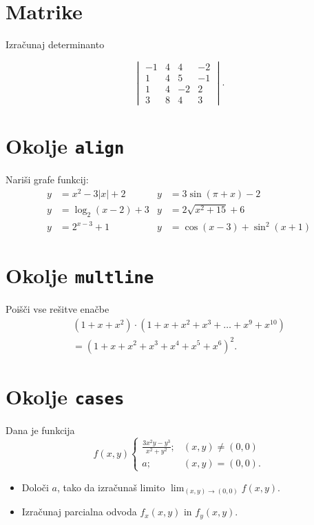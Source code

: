 \documentclass[a4paper,12pt]{article}
\begin{document}
\section*{Matrike}
Izračunaj determinanto

\[
 \begin{vmatrix}   
   -1 & 4 & 4 & -2 \\
   1 & 4 & 5 & -1 \\
   1 & 4 & -2 & 2 \\
   3 & 8 & 4 & 3 
 \end{vmatrix}.
\]

\section*{Okolje \texttt{align}}
Nariši grafe funkcij:
\begin{align*}
y &= x^2 - 3|x| + 2 &  y &= 3 \sin(\pi+x) - 2\\
y &= \log_2(x-2) + 3 & y &= 2 \sqrt{x^2+15} + 6\\
y &= 2^{x-3} + 1  &    y &= \cos(x-3) + \sin^2(x+1)
\end{align*}


\section*{Okolje \texttt{multline}}
Poišči vse rešitve enačbe
\begin{multline*}
(1+x+x^2) \cdot (1+x+x^2+x^3+\ldots+x^9+x^{10}) \\
=(1+x+x^2+x^3+x^4+x^5+x^6)^2.
\end{multline*}

\section*{Okolje \texttt{cases}}
Dana je funkcija
\[
f(x,y)
\begin{cases}
 \frac{3x^2y-y^3}{x^2+y^2};& (x,y)\neq (0,0)\\
 a;&(x,y)=(0,0).
\end{cases}
\]

\begin{itemize}
\item Določi \(a\), tako da izračunaš limito \( \lim_{(x,y)\to(0,0)} f(x,y) \).
\item Izračunaj parcialna odvoda \(f_x(x,y)\) in \(f_y(x,y)\).
\end{itemize}
\end{document}
